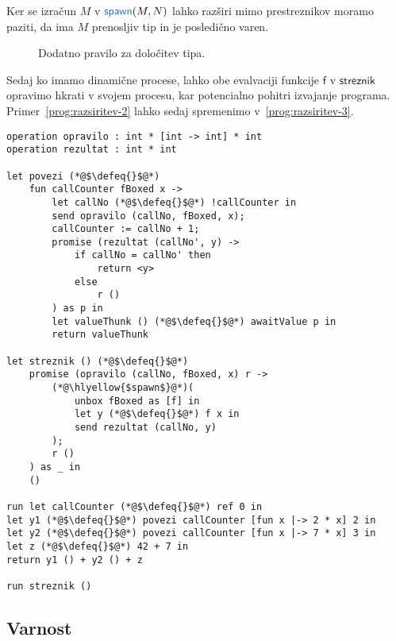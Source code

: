 Ker se izračun $M$ v $\tmspawn{M}{N}$ lahko razširi mimo prestreznikov moramo paziti, da ima $M$ prenosljiv tip in je posledično varen.   

\begin{figure}[H]
	\centering
	\small
	\begin{mathpar}
	\end{mathpar}
	\vspace{-5ex}
	\caption{Dodatno pravilo za določitev tipa.}
	\label{fig:tipi-pravila-spawn}
\end{figure}


Sedaj ko imamo dinamične procese, lahko obe evalvaciji funkcije $\mathsf{f}$ v $\mathsf{streznik}$ opravimo hkrati v svojem procesu, kar potencialno pohitri izvajanje programa. Primer~\ref{prog:razsiritev-2} lahko sedaj spremenimo v~\ref{prog:razsiritev-3}. 

\begin{lstlisting}[caption={Primer z dinamičnimi procesi},label={prog:razsiritev-3},float,floatplacement=H]
operation opravilo : int * [int -> int] * int
operation rezultat : int * int

let povezi (*@$\defeq{}$@*)
	fun callCounter fBoxed x ->
		let callNo (*@$\defeq{}$@*) !callCounter in
		send opravilo (callNo, fBoxed, x);
		callCounter := callNo + 1;
		promise (rezultat (callNo', y) ->
			if callNo = callNo' then
				return <y>
			else
				r ()
		) as p in
		let valueThunk () (*@$\defeq{}$@*) awaitValue p in
		return valueThunk

let streznik () (*@$\defeq{}$@*)
	promise (opravilo (callNo, fBoxed, x) r ->
		(*@\hlyellow{$spawn$}@*)(
			unbox fBoxed as [f] in
			let y (*@$\defeq{}$@*) f x in
			send rezultat (callNo, y)
		);
		r ()
	) as _ in
	()

run	let callCounter (*@$\defeq{}$@*) ref 0 in
let y1 (*@$\defeq{}$@*) povezi callCounter [fun x |-> 2 * x] 2 in
let y2 (*@$\defeq{}$@*) povezi callCounter [fun x |-> 7 * x] 3 in
let z (*@$\defeq{}$@*) 42 + 7 in
return y1 () + y2 () + z

run streznik ()
\end{lstlisting}


\subsection{Varnost}



